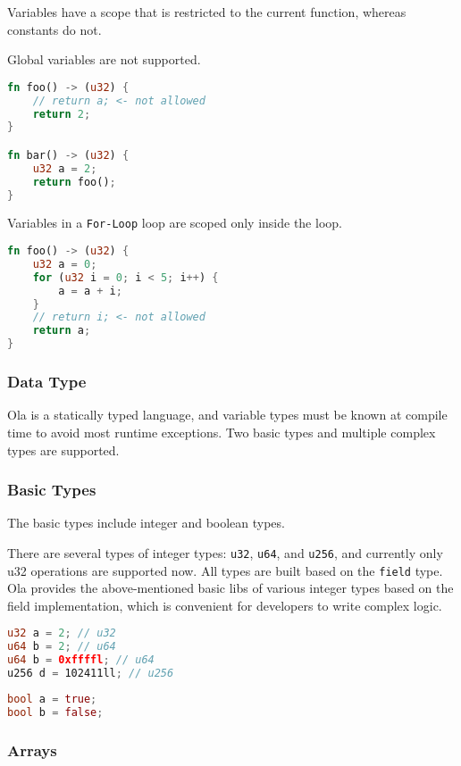 Variables have a scope that is restricted to the current function, whereas constants do not.

Global variables are not supported.

\begin{lstlisting}[language=rust]
fn foo() -> (u32) {
    // return a; <- not allowed
    return 2;
}

fn bar() -> (u32) {
    u32 a = 2;
    return foo();
}
\end{lstlisting}

Variables in a \texttt{For-Loop} loop are scoped only inside the loop.

\begin{lstlisting}[language=rust]
fn foo() -> (u32) {
    u32 a = 0;
    for (u32 i = 0; i < 5; i++) {
        a = a + i;
    }
    // return i; <- not allowed
    return a;
}
\end{lstlisting}

\subsubsection{Data Type}

Ola is a statically typed language, and variable types must be known at compile time to avoid most runtime exceptions. 
Two basic types and multiple complex types are supported.

\subsubsection*{Basic Types}

The basic types include integer and boolean types.

There are several types of integer types: \texttt{u32}, \texttt{u64}, and \texttt{u256}, and currently only u32 operations are supported now. 
All types are built based on the \texttt{field} type.
Ola provides the above-mentioned basic libs of various integer types based on the field implementation, which is convenient for developers to write complex logic.

\begin{lstlisting}[language=rust]
u32 a = 2; // u32
u64 b = 2; // u64
u64 b = 0xffffl; // u64
u256 d = 102411ll; // u256
\end{lstlisting}

\begin{lstlisting}[language=rust]
bool a = true;
bool b = false;
\end{lstlisting}
\subsubsection*{Arrays}

